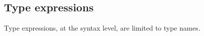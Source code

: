 \subsection{Type expressions}
\label{sec:typing-type-expressions}


{\TE \vdash {} \gives \tau}

Type expressions, at the syntax level, are limited to type names.




